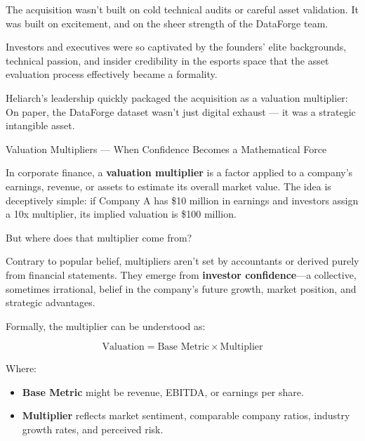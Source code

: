 The acquisition wasn’t built on cold technical audits or careful asset validation. It was built on excitement, and on the sheer strength of the DataForge team.

Investors and executives were so captivated by the founders’ elite backgrounds, technical passion, and insider credibility in the esports space that the asset evaluation process effectively became a formality.

Heliarch’s leadership quickly packaged the acquisition as a valuation multiplier: On paper, the DataForge dataset wasn’t just digital exhaust --- it was a strategic intangible asset.

\medskip

\begin{HistoricalSidebar}{Valuation Multipliers --- When Confidence Becomes a Mathematical Force}

    In corporate finance, a \textbf{valuation multiplier} is a factor applied to a company’s earnings, revenue, or assets to estimate its overall market value. The idea is deceptively simple:  
    if Company A has \$10 million in earnings and investors assign a 10x multiplier, its implied valuation is \$100 million.  
    
    \medskip
    
    But where does that multiplier come from?
    
    \medskip
    
    Contrary to popular belief, multipliers aren’t set by accountants or derived purely from financial statements.  
    They emerge from \textbf{investor confidence}—a collective, sometimes irrational, belief in the company’s future growth, market position, and strategic advantages.
    
    \medskip
    
    Formally, the multiplier can be understood as:

    \medskip
    
    \[
    \text{Valuation} = \text{Base Metric} \times \text{Multiplier}
    \]

    \medskip
    
    Where:

    \medskip

    \begin{itemize}
        \item \textbf{Base Metric} might be revenue, EBITDA, or earnings per share.
        \item \textbf{Multiplier} reflects market sentiment, comparable company ratios, industry growth rates, and perceived risk.
    \end{itemize}
    

\end{HistoricalSidebar}
